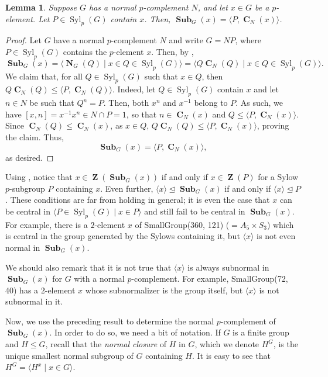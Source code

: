 \documentclass[12pt]{amsart}
\DeclareMathOperator{\ZB}{\mathbf{Z}}
\DeclareMathOperator{\CB}{\mathbf{C}}
\DeclareMathOperator{\NB}{\mathbf{N}}
\DeclareMathOperator{\Syl}{Syl}
\DeclareMathOperator{\Sub}{\mathbf{Sub}}
\theoremstyle{remark}
\theoremstyle{definition}
\theoremstyle{plain}
\newtheorem{lem}[thm]{Lemma}
\theoremstyle{definition}
\numberwithin{equation}{section}
\begin{document}
\begin{lem}
	\label{SubnormalizerNormalComplement}
	Suppose $G$ has a normal $p$-complement $N$, and let $x \in G$ be a $p$-element. Let $P \in \Syl_p(G)$ contain $x$. Then, $\Sub_G(x) = \langle P, \CB_N(x) \rangle$.
\end{lem}
\begin{proof}
	Let $G$ have a normal $p$-complement $N$ and write $G = NP$, where $P \in \Syl_p(G)$ contains the $p$-element $x$. Then, by \cite[Proposition 2.6]{GunterSubnormalizer},
	\begin{equation*}
		\Sub_G(x) = \langle \NB_G(Q) \mid x \in Q \in \Syl_p(G) \rangle = \langle Q \CB_N(Q) \mid x \in Q \in \Syl_p(G) \rangle.
	\end{equation*}
	We claim that, for all $Q \in \Syl_p(G)$ such that $x \in Q$, then $Q\CB_N(Q) \leq \langle P, \CB_N(Q) \rangle$. Indeed, let $Q \in \Syl_p(G)$ contain $x$ and let $n \in N$ be such that $Q^n = P$. Then, both $x^n$ and $x^{-1}$ belong to $P$. As such, we have $[x, n] = x^{-1}x^n \in N \cap P = 1$, so that $n \in \CB_N(x)$ and $Q \leq \langle P, \CB_N(x) \rangle$. Since $\CB_N(Q) \leq \CB_N(x)$, as $x \in Q$, $Q\CB_N(Q) \leq \langle P, \CB_N(x) \rangle$, proving the claim. Thus,
	\begin{equation*}
		\Sub_G(x) = \langle P, \CB_N(x) \rangle,
	\end{equation*}
	as desired.
\end{proof}

Using , notice that $x \in \ZB(\Sub_G(x))$ if and only if $x \in \ZB(P)$ for a Sylow $p$-subgroup $P$ containing $x$. Even further, $\langle x \rangle \unlhd \Sub_G(x)$ if and only if $\langle x \rangle \unlhd P$. These conditions are far from holding in general; it is even the case that $x$ can be central in $\langle P \in \Syl_p(G) \mid x \in P \rangle$ and still fail to be central in $\Sub_G(x)$. For example, there is a $2$-element $x$ of SmallGroup(360, 121) ($= A_5 \times S_3$) which is central in the group generated by the Sylows containing it, but $\langle x \rangle$ is not even normal in $\Sub_G(x)$.

We should also remark that it is not true that $\langle x \rangle$ is always subnormal in $\Sub_G(x)$ for $G$ with a normal $p$-complement. For example, SmallGroup(72, 40) has a $2$-element $x$ whose subnormalizer is the group itself, but $\langle x \rangle$ is not subnormal in it.

Now, we use the preceding result to determine the normal $p$-complement of $\Sub_G(x)$. In order to do so, we need a bit of notation. If $G$ is a finite group and $H \leq G$, recall that the \emph{normal closure} of $H$ in $G$, which we denote $H^G$, is the unique smallest normal subgroup of $G$ containing $H$. It is easy to see that $H^G = \langle H^x \mid x \in G \rangle$.
\end{document}
